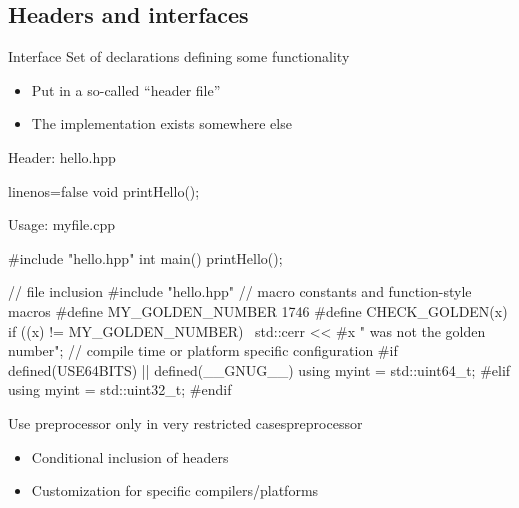 \subsection[.h]{Headers and interfaces}

\begin{frame}[fragile]
  \begin{block}{Interface}
    Set of declarations defining some functionality
    \begin{itemize}
    \item Put in a so-called ``header file''
    \item The implementation exists somewhere else
    \end{itemize}
  \end{block}
  \begin{block}{Header: hello.hpp}
    \begin{cppcode*}{linenos=false}
      void printHello();
    \end{cppcode*}
  \end{block}
  \begin{block}{Usage: myfile.cpp}
    \begin{cppcode*}{}
      #include "hello.hpp"
      int main() {
        printHello();
      }
    \end{cppcode*}
  \end{block}
\end{frame}

\begin{frame}[fragile]
  \begin{cppcode}
    // file inclusion
    #include "hello.hpp"
    // macro constants and function-style macros
    #define MY_GOLDEN_NUMBER 1746
    #define CHECK_GOLDEN(x) if ((x) != MY_GOLDEN_NUMBER) \
      std::cerr << #x " was not the golden number\n";
    // compile time or platform specific configuration
    #if defined(USE64BITS) || defined(__GNUG__)
      using myint = std::uint64_t;
    #elif
      using myint = std::uint32_t;
    #endif
  \end{cppcode}
  \pause
  \begin{goodpracticeWithShortcut}{Use preprocessor only in very restricted cases}{preprocessor}
    \begin{itemize}
      \item Conditional inclusion of headers
      \item Customization for specific compilers/platforms
    \end{itemize}
  \end{goodpracticeWithShortcut}
\end{frame}


